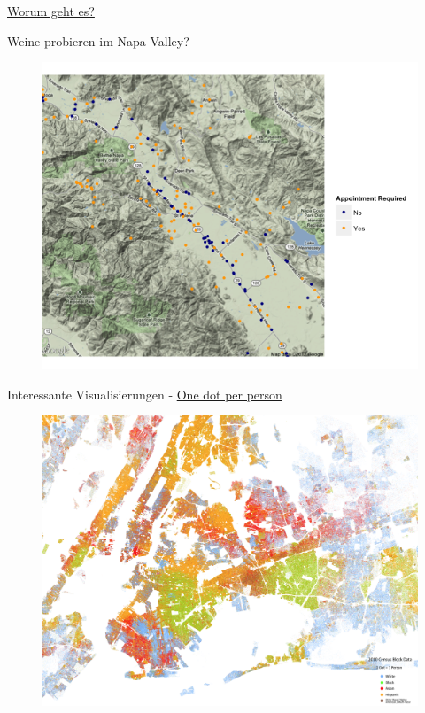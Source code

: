 \documentclass[ignorenonframetext,]{beamer}
\begin{document}
\begin{frame}{\href{http://blog.revolutionanalytics.com/2012/07/making-beautiful-maps-in-r-with-ggmap.html}{Worum
geht es?}}

\begin{block}{Weine probieren im Napa Valley?}

\begin{figure}
\centering
\includegraphics{figure/Wine_nappa.png}
\caption{}
\end{figure}

\end{block}

\end{frame}

\begin{frame}{Interessante Visualisierungen -
\href{https://carsten.io/the-racial-dot-map-one-dot-per-person-for-the-entire-u-s/}{One
dot per person}}

\begin{figure}
\centering
\includegraphics{figure/racemap.png}
\caption{}
\end{figure}

\end{frame}
\end{document}
